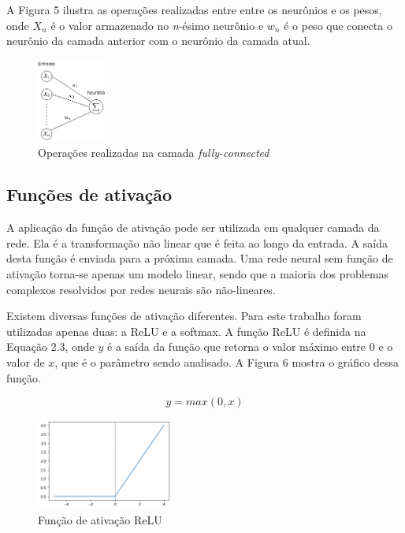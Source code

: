 A Figura 5 ilustra as operações realizadas entre entre os neurônios e os pesos, onde $X_n$ é o valor armazenado no \textit{n}-ésimo neurônio e $w_n$ é o peso que conecta o neurônio da camada anterior com o neurônio da camada atual.

\begin{figure}[H]
	\includegraphics[width=0.2\textwidth, keepaspectratio=true]{figuras/rna.png}
	\centering
	\caption[Operações realizadas na camada \textit{fully-connected}]{Operações realizadas na camada \textit{fully-connected}}
\end{figure}

\subsection{Funções de ativação}
A aplicação da função de ativação pode ser utilizada em qualquer camada da rede. Ela é a transformação não linear que é feita ao longo da entrada. A saída desta função é enviada para a próxima camada. Uma rede neural sem função de ativação torna-se apenas um modelo linear, sendo que a maioria dos problemas complexos resolvidos por redes neurais são não-lineares.

Existem diversas funções de ativação diferentes. Para este trabalho foram utilizadas apenas duas: a ReLU e a softmax. A função ReLU é definida na Equação 2.3, onde $y$ é a saída da função que retorna o valor máximo entre 0 e o valor de $x$, que é o parâmetro sendo analisado. A Figura 6 mostra o gráfico dessa função.

\begin{equation}
    y = max(0,x)
\end{equation}

\begin{figure}[H]
	\includegraphics[width=0.4\textwidth, keepaspectratio=true]{figuras/relu.png}
	\centering
	\caption[Função de ativação ReLU]{Função de ativação ReLU}
\end{figure}

